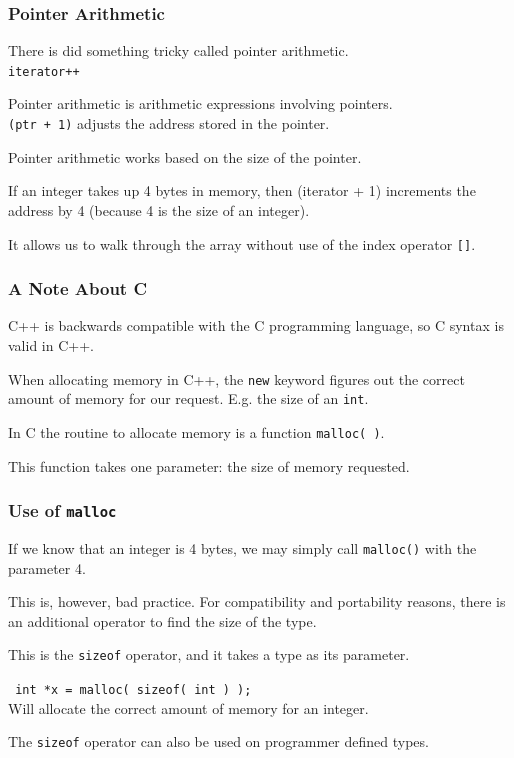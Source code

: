 \begin{frame}
\frametitle{Pointer Arithmetic}

There is did something tricky called \alert{pointer arithmetic}.\\
\quad \texttt{iterator++}

Pointer arithmetic is arithmetic expressions involving pointers.\\
\quad \texttt{(ptr + 1)} adjusts the address stored in the pointer.

Pointer arithmetic works based on the size of the pointer.

If an integer takes up 4 bytes in memory, then {(iterator + 1)} increments the address by 4 (because 4 is the size of an integer).

It allows us to walk through the array without use of the index operator \texttt{[]}.

\end{frame}



\begin{frame}
\frametitle{A Note About C}

C++ is backwards compatible with the C programming language, so C syntax is valid in C++.

When allocating memory in C++, the \texttt{new} keyword figures out the correct amount of memory for our request. E.g. the size of an \texttt{int}.

In C the routine to allocate memory is a function \texttt{malloc( )}.

This function takes one parameter: the size of memory requested.

\end{frame}



\begin{frame}
\frametitle{Use of \texttt{malloc}}

If we know that an integer is 4 bytes, we may simply call \texttt{malloc()} with the parameter 4.

This is, however, bad practice. For compatibility and portability reasons, there is an additional operator to find the size of the type.

This is the \texttt{sizeof} operator, and it takes a type as its parameter.

\texttt{ int *x = malloc( sizeof( int ) );}\\
\quad Will allocate the correct amount of memory for an integer.

The \texttt{sizeof} operator can also be used on programmer defined types.

\end{frame}



